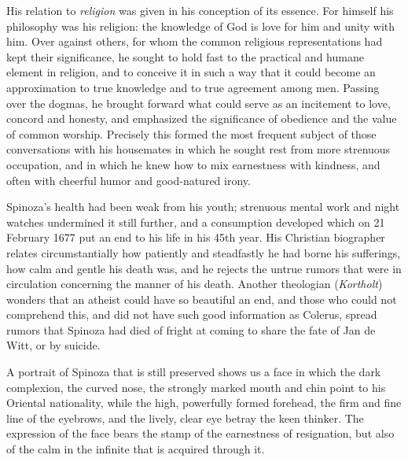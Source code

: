 \documentclass[12pt,a4paper,openany]{book}
\newcommand{\opage}[1]{\marginnote{\footnotesize\textit{[#1]}}}
\begin{document}
His relation to \emph{religion} was given in his conception of its
essence. For himself his philosophy was his religion: the knowledge of
God is love for him and unity with him. Over against others, for whom
the common religious representations had kept their significance, he
sought to hold fast to the practical and humane element in religion, and
to conceive it in such a way that it could become an approximation to
true knowledge and to true agreement among men. Passing over the dogmas,
he brought forward what could serve as an incitement to love, concord and
honesty, and emphasized the significance of obedience and the value of
common worship. Precisely this formed the most frequent subject of those
conversations with his housemates in which he sought rest from more
strenuous occupation, and in which he knew how to mix earnestness with
kindness, and often with cheerful humor and good-natured irony.

Spinoza's health had been weak from his youth; strenuous mental work and
night watches undermined it still further, and a consumption developed
which on 21 February 1677 put an end to his life in his 45th year. His
Christian biographer relates circumstantially how patiently and
steadfastly he had borne his sufferings, how calm and gentle his death
was, and he rejects the untrue rumors that were in circulation
concerning the manner of his death.
\opage{34}\setcounter{footnote}{0}Another theologian (\emph{Kortholt})
wonders that an atheist could have so beautiful an end, and those who
could not comprehend this, and did not have such good information as
Colerus, spread rumors that Spinoza had died of fright at coming to share
the fate of Jan de Witt, or by suicide.

A portrait of Spinoza that is still preserved shows us a face in which
the dark complexion, the curved nose, the strongly marked mouth and chin
point to his Oriental nationality, while the high, powerfully formed
forehead, the firm and fine line of the eyebrows, and the lively, clear
eye betray the keen thinker. The expression of the face bears the stamp
of the earnestness of resignation, but also of the calm in the infinite
that is acquired through it.
\end{document}
